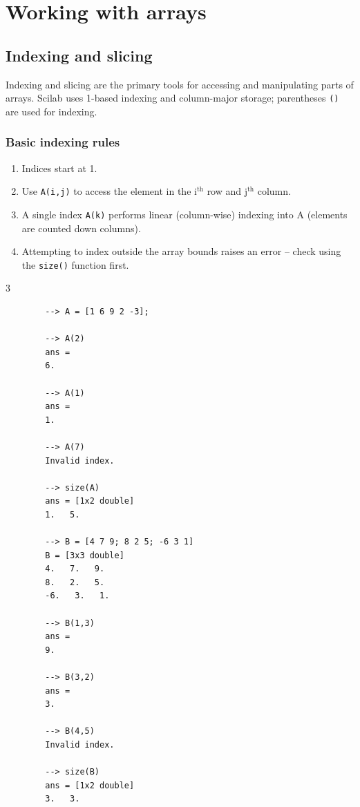 \section{Working with arrays}

\subsection{Indexing and slicing}
Indexing and slicing are the primary tools for accessing and manipulating parts of arrays. Scilab uses 1-based indexing and column-major storage; parentheses \verb|()| are used for indexing.

\subsubsection{Basic indexing rules}
\begin{enumerate}
	\item Indices start at 1.
	\item Use \verb|A(i,j)| to access the element in the i$^\text{th}$ row and j$^\text{th}$ column.
	\item A single index \verb|A(k)| performs linear (column-wise) indexing into A (elements are counted down columns).
	\item Attempting to index outside the array bounds raises an error -- check using the \verb|size()| function first.
\end{enumerate}
\begin{multicols}{3}
	\begin{verbatim}
		--> A = [1 6 9 2 -3];
		
		--> A(2)
		ans = 
		6.
		
		--> A(1)
		ans = 
		1.
		
		--> A(7)
		Invalid index.
		
		--> size(A)
		ans = [1x2 double]
		1.   5.
		
		--> B = [4 7 9; 8 2 5; -6 3 1]
		B = [3x3 double]
		4.   7.   9.
		8.   2.   5.
		-6.   3.   1.
		
		--> B(1,3)
		ans = 
		9.
		
		--> B(3,2)
		ans = 
		3.
		
		--> B(4,5)
		Invalid index.
		
		--> size(B)
		ans = [1x2 double]
		3.   3.
	\end{verbatim}
\end{multicols}

